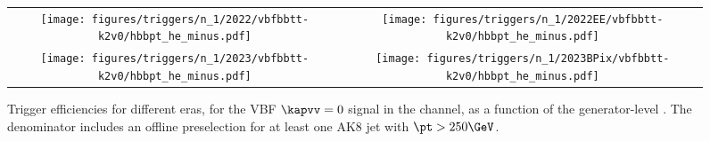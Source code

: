 
    \begin{figure}[H]
        \centering
        \begin{tabular}{cc}
            \texttt{[image: figures/triggers/n\_1/2022/vbfbbtt-k2v0/hbbpt\_he\_minus.pdf]} &
            \texttt{[image: figures/triggers/n\_1/2022EE/vbfbbtt-k2v0/hbbpt\_he\_minus.pdf]} \\[1ex]
            \texttt{[image: figures/triggers/n\_1/2023/vbfbbtt-k2v0/hbbpt\_he\_minus.pdf]} &
            \texttt{[image: figures/triggers/n\_1/2023BPix/vbfbbtt-k2v0/hbbpt\_he\_minus.pdf]}
            \label{fig}
        \end{tabular}
\caption{Trigger efficiencies for different eras, for the VBF \HHbbtt $\kapvv=0$ signal in the \tauhe channel, as a function of the generator-level \hbb \pt. The denominator includes an offline preselection for at least one AK8 jet with $\pt > 250\GeV$.}
\label{fig:triggers_n-1_vbfbbtt-k2v0_he_hbbpt}
\end{figure}
